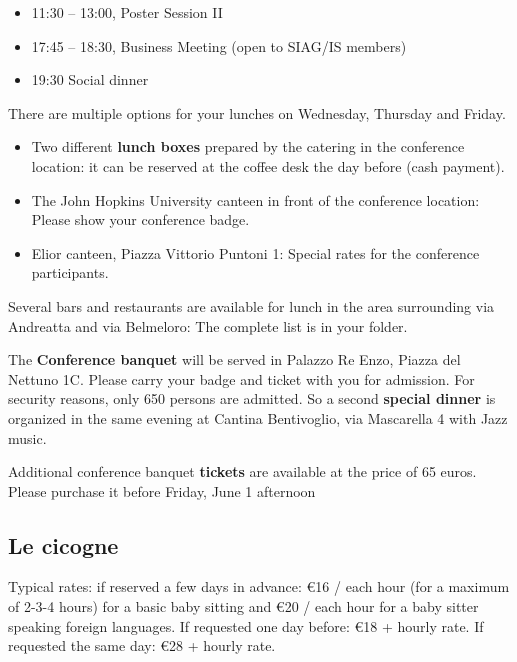 \begin{itemize}
  \item[] 11:30 -- 13:00, Poster Session II
  \item[] 17:45 -- 18:30, Business Meeting (open to SIAG/IS members)
  \item[] 19:30 Social dinner
\end{itemize}

\newpage %
There are multiple options for your lunches on Wednesday, Thursday and Friday. 
\bigskip
\begin{itemize}
  \item Two different \textbf{lunch boxes} prepared by the catering in the conference location: it can be reserved at the coffee desk the day before (cash payment).
  \item The John Hopkins University canteen in front of the conference location: Please show your conference badge.
  \item Elior canteen, Piazza Vittorio Puntoni 1: Special rates for the conference participants.
\end{itemize}
\bigskip
Several bars and restaurants are available for lunch in the area surrounding via Andreatta and via Belmeloro: The complete list is in your folder.

The \textbf{Conference banquet} will be served in Palazzo Re Enzo, Piazza del Nettuno 1C. Please carry your badge and ticket with you for admission. For security
reasons, only 650 persons are admitted. So a second \textbf{special dinner} is organized in the same evening at Cantina Bentivoglio, via Mascarella 4 with 
Jazz music.

\bigskip 

\noindent Additional conference banquet \textbf{tickets} are available at the price of 65 euros. 
Please purchase it before Friday, June 1 afternoon

\subsection*{Le cicogne} 
Typical rates: if reserved a few days in advance: \euro 16 / each hour (for a maximum of 2-3-4 hours) for a basic baby sitting 
and \euro 20 / each hour for a baby sitter speaking foreign languages.
If requested one day before: \euro 18 + hourly rate.
If requested the same day: \euro 28 + hourly rate.

